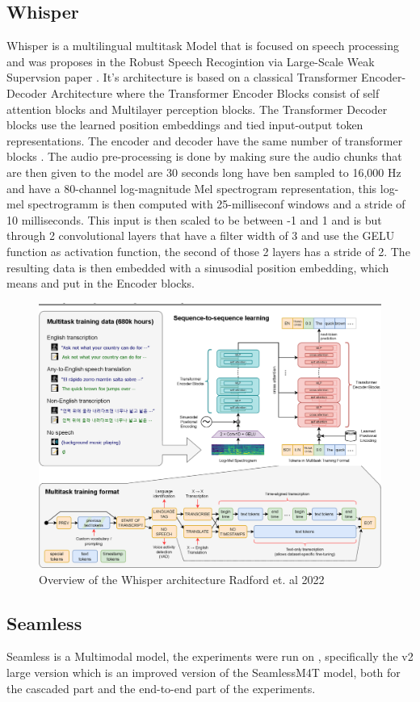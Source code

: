 \subsection{Whisper}
Whisper is a multilingual multitask Model that is focused on speech processing and was proposes in the Robust Speech Recogintion via Large-Scale Weak Supervsion paper \cite{radford2022robust}. 
It's architecture is based on a classical Transformer Encoder-Decoder Architecture where the Transformer Encoder Blocks consist of self attention blocks and Multilayer perception blocks. 
The Transformer Decoder blocks use the learned position embeddings and tied input-output token representations. 
The encoder and decoder have the same number of transformer blocks .
The audio pre-processing is done by making sure the audio chunks that are then given to the model are 30 seconds long have ben sampled to 16,000 Hz and have a 80-channel log-magnitude Mel spectrogram representation, this log-mel spectrogramm is then computed with 25-milliseconf windows and a stride of 10 milliseconds. 
This input is then scaled to be between -1 and 1 and is but through 2 convolutional layers that have a filter width of 3 and use the GELU function as activation function, the second of those 2 layers has a stride of 2. 
The resulting data is then embedded with a sinusodial position embedding, which means %
and put in the Encoder blocks. 

\begin{figure}
        \centering%
        \includegraphics[width=0.5\linewidth]{Latex//sections//images/whispermodel.png}
        \caption{Overview of the Whisper architecture Radford et. al 2022}
        \label{fig:whispermodel}
    \end{figure}


\subsection{Seamless}

Seamless is a Multimodal model, the experiments were run on \cite{seamless2023}, specifically the v2 large version which is an improved version of the SeamlessM4T model, both for the cascaded part and the end-to-end part of the experiments.

